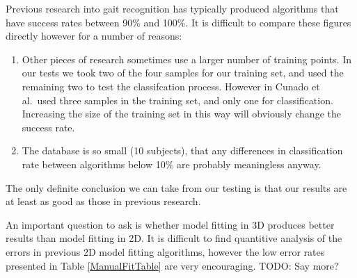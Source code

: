 Previous research into gait recognition has typically produced algorithms that have success rates between 90\% and 100\%.
It is difficult to compare these figures directly however for a number of reasons:

\begin{enumerate}
	\item Other pieces of research sometimes use a larger number of training points.
		In our tests we took two of the four samples for our training set, and used the remaining two to test the classifcation process.
		However in \cite{GaitModels} Cunado et al.\ used three samples in the training set, and only one for classification.
		Increasing the size of the training set in this way will obviously change the success rate.
	\item The database is so small (10 subjects), that any differences in classification rate between algorithms below 10\% are probably meaningless anyway.
\end{enumerate}

The only definite conclusion we can take from our testing is that our results are at least as good as those in previous research.

\bigskip
\noindent An important question to ask is whether model fitting in 3D produces better results than model fitting in 2D.
It is difficult to find quantitive analysis of the errors in previous 2D model fitting algorithms, however the low error rates presented in Table \ref{ManualFitTable} are very encouraging.
TODO: Say more?
